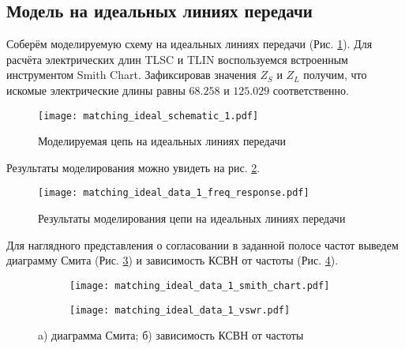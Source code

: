 \subsection{Модель на идеальных линиях передачи}

Соберём моделируемую схему на идеальных линиях передачи (Рис. \ref{fig:matching_ideal_schematic_1}). Для расчёта электрических длин TLSC и TLIN воспользуемся встроенным инструментом Smith Chart. Зафиксировав значения $Z_S$ и $Z_L$ получим, что искомые электрические длины равны $68.258$ и $125.029$ соответственно.

\begin{figure}[!ht]
    \centering
    \texttt{[image: matching\_ideal\_schematic\_1.pdf]}
    \caption{Моделируемая цепь на идеальных линиях передачи}
    \label{fig:matching_ideal_schematic_1}
\end{figure}

Результаты моделирования можно увидеть на рис. \ref{fig:matching_ideal_data_1_freq_response}.

\begin{figure}[!ht]
    \centering
    \texttt{[image: matching\_ideal\_data\_1\_freq\_response.pdf]}
    \caption{Результаты моделирования цепи на идеальных линиях передачи}
    \label{fig:matching_ideal_data_1_freq_response}
\end{figure}

Для наглядного представления о согласовании в заданной полосе частот выведем диаграмму Смита (Рис. \ref{fig:matching_ideal_data_1_smith_chart}) и зависимость КСВН от частоты (Рис. \ref{fig:matching_ideal_data_1_vswr}).

\begin{figure}[!ht]
    \begin{subfigure}[b]{0.45\textwidth}
        \centering
        \texttt{[image: matching\_ideal\_data\_1\_smith\_chart.pdf]}
        \caption{}
        \label{fig:matching_ideal_data_1_smith_chart}
    \end{subfigure}
    \hfill
    \begin{subfigure}[b]{0.45\textwidth}
        \centering
        \texttt{[image: matching\_ideal\_data\_1\_vswr.pdf]}
        \caption{}
        \label{fig:matching_ideal_data_1_vswr}
    \end{subfigure}
    \caption{
        a) диаграмма Смита;
        б) зависимость КСВН от частоты
    }
    \label{fig:matching_ideal_data_display_1}
\end{figure}

